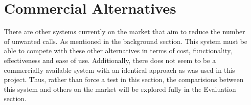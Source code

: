 \documentclass[main.tex]{subfiles}
\begin{document}
\section{Commercial Alternatives}
There are other systems currently on the market that aim to reduce the number of unwanted calls. As mentioned in the background section. This system must be able to compete with these other alternatives in terms of cost, functionality, effectiveness and ease of use. Additionally, there does not seem to be a commercially available system with an identical approach as was used in this project. Thus, rather than force a test in this section, the comparisions between this system and others on the market will be explored fully in the Evaluation section.
\end{document}
